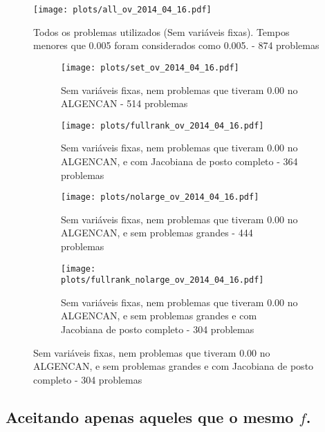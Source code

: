 \documentclass{article}
\begin{document}
\begin{figure}[H]
  \centering
  \texttt{[image: plots/all\_ov\_2014\_04\_16.pdf]}
  \caption{Todos os problemas utilizados (Sem variáveis fixas). Tempos menores
    que 0.005 foram considerados como 0.005. - 874 problemas}
\end{figure}
\begin{figure}[H]
  \centering
  \begin{subfigure}{0.48\textwidth}
    \texttt{[image: plots/set\_ov\_2014\_04\_16.pdf]}
    \caption{Sem variáveis fixas, nem problemas
      que tiveram 0.00 no ALGENCAN - 514 problemas}
  \end{subfigure}
  \begin{subfigure}{0.48\textwidth}
    \texttt{[image: plots/fullrank\_ov\_2014\_04\_16.pdf]}
    \caption{Sem variáveis fixas, nem problemas
      que tiveram 0.00 no ALGENCAN, e com Jacobiana de posto completo - 364
      problemas}
  \end{subfigure}
  \begin{subfigure}{0.48\textwidth}
    \texttt{[image: plots/nolarge\_ov\_2014\_04\_16.pdf]}
    \caption{Sem variáveis fixas, nem problemas
      que tiveram 0.00 no ALGENCAN, e sem problemas grandes - 444 problemas}
  \end{subfigure}
  \begin{subfigure}{0.48\textwidth}
    \texttt{[image: plots/fullrank\_nolarge\_ov\_2014\_04\_16.pdf]}
    \caption{Sem variáveis fixas, nem problemas
      que tiveram 0.00 no ALGENCAN, e sem problemas grandes e com Jacobiana de
      posto completo - 304 problemas}
  \end{subfigure}
\end{figure}

\subsection{Aceitando apenas aqueles que o mesmo $f$. }
\end{document}
